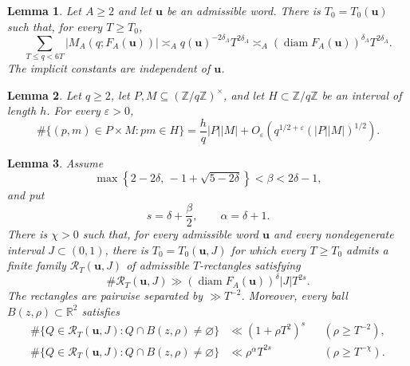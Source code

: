 \documentclass[10pt,a4paper]{amsart}
\newtheorem{lemma}{Lemma}
\newcommand{\R}{\mathbb R}
\newcommand{\Z}{\mathbb Z}
\newcommand{\diam}{\operatorname{diam}}
\newcommand{\eps}{\varepsilon}
\begin{document}
\begin{lemma}\label{lem:fixed-prefix-count}
Let $A\ge2$ and let $\mathbf{u}$ be an admissible word.  There is
$T_0=T_0(\mathbf{u})$ such that, for every $T\ge T_0$,
\begin{equation}\label{eq:fixed-prefix-count}
 \sum_{T\le q<6T}|M_A(q;F_A(\mathbf{u}))|
 \asymp_A q(\mathbf{u})^{-2\delta_A}T^{2\delta_A}
 \asymp_A (\diam F_A(\mathbf{u}))^{\delta_A}T^{2\delta_A}.
\end{equation}
The implicit constants are independent of $\mathbf{u}$.
\end{lemma}

\begin{lemma}\label{lem:bilinear-count}
Let $q\ge2$, let $P,M\subseteq(\Z/q\Z)^\times$, and let
$H\subset\Z/q\Z$ be an interval of length $h$.  For every $\eps>0$,
\begin{equation}\label{eq:bilinear-count}
 \#\{(p,m)\in P\times M:pm\in H\}
 =\frac{h}{q}|P||M|
 +O_\eps\left(q^{1/2+\eps}(|P||M|)^{1/2}\right).
\end{equation}
\end{lemma}

\begin{lemma}\label{lem:pair-rectangles}
Assume
\begin{equation}\label{eq:beta-range}
 \max\left\{2-2\delta,\,-1+\sqrt{5-2\delta}\right\}<\beta<2\delta-1,
\end{equation}
and put
\begin{equation}\label{eq:s-a-def}
 s=\delta+\frac\beta2,\qquad \alpha=\delta+1.
\end{equation}
There is $\chi>0$ such that, for every admissible word $\mathbf{u}$ and every
nondegenerate interval $J\subset(0,1)$, there is $T_0=T_0(\mathbf{u},J)$ for
which every $T\ge T_0$ admits a finite family $\mathcal R_T(\mathbf{u},J)$ of
admissible $T$-rectangles satisfying
\begin{equation}\label{eq:pair-rectangle-lower}
 \#\mathcal R_T(\mathbf{u},J)
 \gg (\diam F_A(\mathbf{u}))^\delta |J|T^{2s}.
\end{equation}
The rectangles are pairwise separated by $\gg T^{-2}$.  Moreover, every ball
$B(z,\rho)\subset\R^2$ satisfies
\begin{align}
 \#\{Q\in\mathcal R_T(\mathbf{u},J):Q\cap B(z,\rho)\ne\varnothing\}
 &\ll (1+\rho T^2)^s &&(\rho\ge T^{-2}),
 \label{eq:pair-local-s}\\
 \#\{Q\in\mathcal R_T(\mathbf{u},J):Q\cap B(z,\rho)\ne\varnothing\}
 &\ll \rho^\alpha T^{2s} &&(\rho\ge T^{-\chi}).
 \label{eq:pair-local-a}
\end{align}
\end{lemma}
\end{document}

